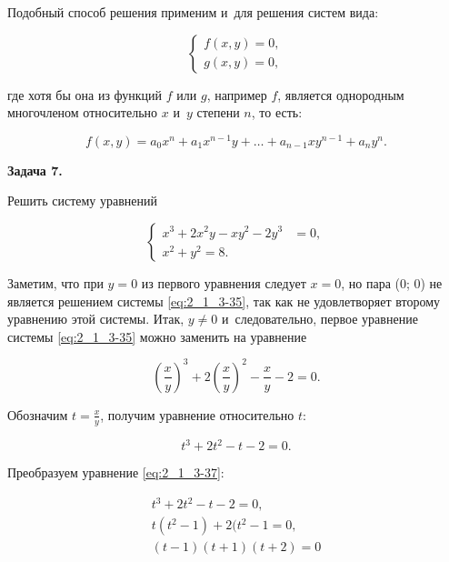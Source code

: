 Подобный способ решения применим и~для решения систем вида:

\begin{equation}\label{eq:2_1_3-34}
\begin{cases}
f(x, y) = 0, \\
g(x, y) = 0,
\end{cases}
\end{equation}

\noindent
где хотя бы она из функций $f$ или $g$, например $f$, является однородным многочленом
относительно $x$ и~$y$ степени $n$, то есть:

\begin{equation*}
f(x, y) = a_{0}x^{n} + a_{1}x^{n-1}y + \dots + a_{n-1}xy^{n-1} + a_{n}y^{n}.
\end{equation*}

\hypertarget{ex:2_1_3_7}{\textbf{Задача 7.}} Решить систему уравнений

\begin{equation}\label{eq:2_1_3-35}
\begin{cases}
x^{3} + 2x^{2}y - xy^{2} - 2y^{3} &= 0, \\
x^{2} + y^{2} = 8.
\end{cases}
\end{equation}

Заметим, что при $y = 0$ из первого уравнения следует $x = 0$,
но пара (0; 0) не является решением системы \eqref{eq:2_1_3-35},
так как не удовлетворяет второму уравнению этой системы.
Итак, $y \ne 0$ и~следовательно, первое уравнение системы \eqref{eq:2_1_3-35}
можно заменить на уравнение

\begin{equation}\label{eq:2_1_3-36}
\displaystyle
\left(
\frac{x}{y}
\right)^{3} +
2\left(
\frac{x}{y}
\right)^{2} -
\frac{x}{y} -
2 = 0.
\end{equation}

Обозначим $\displaystyle t = \frac{x}{y}$, получим уравнение относительно $t$:

\begin{equation}\label{eq:2_1_3-37}
t^{3} + 2t^{2} - t - 2 = 0.
\end{equation}

Преобразуем уравнение \eqref{eq:2_1_3-37}:

\begin{gather*}
t^{3} + 2t^{2} - t - 2 = 0, \\
t(t^{2} - 1) + 2(t^{2} - 1 = 0, \\
(t - 1)(t + 1)(t + 2) = 0
\end{gather*}

